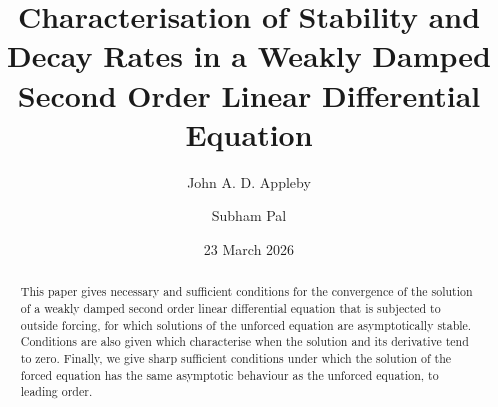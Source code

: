 \documentclass[10pt,reqno]{amsart}
\theoremstyle{definition}
\begin{document}
	\title[Asymptotics of Second order Linear ODEs]
	{Characterisation of Stability and Decay Rates in a Weakly Damped Second Order Linear Differential Equation}
	
	\author{John A. D. Appleby}
	\address{School of Mathematical
		Sciences, Dublin City University, Glasnevin, Dublin 9, Ireland}
	
	\author{Subham Pal}
	\address{School of Mathematical
		Sciences, Dublin City University, Glasnevin, Dublin 9, Ireland}
	
	\subjclass{}
	\date{23 March 2026}
	
	\begin{abstract}
		This paper gives necessary and sufficient conditions for the convergence of the solution of a weakly damped second order linear differential equation that is subjected to outside forcing, for which solutions of the unforced equation are asymptotically stable. Conditions are also given which characterise when the solution and its derivative tend to zero. Finally, we give sharp sufficient conditions under which the solution of the forced equation has the same asymptotic behaviour as the unforced equation, to leading order.  
	\end{abstract}
	
	\maketitle
	
\end{document}
